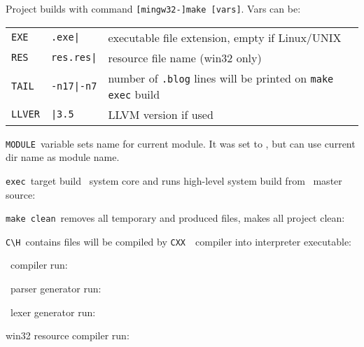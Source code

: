 \label{makes}

Project builds with command \verb|[mingw32-]make [vars]|. Vars can be:\bigskip

\begin{tabular}{l l l}
\verb$EXE$ & \verb$.exe|$ & executable file extension, empty if Linux/UNIX \\ 
\verb$RES$ & \verb$res.res|$ & resource file name (win32 only) \\
\verb$TAIL$ & \verb$-n17|-n7$ & number of \verb$.blog$ lines
will be printed on \verb$make exec$ build \\
\verb$LLVER$ & \verb$|3.5$ & LLVM version if used \\
\end{tabular}\bigskip

\verb|MODULE|\ variable sets name for current module.
It was set to \bi, but can use current dir name as module name. 


\verb|exec|\ target build \bi\ system core and runs high-level system build 
from \ master source: 


\verb|make clean|\ removes all temporary and produced files, makes all project
clean:


\verb|C\H|\ contains files will be compiled by \verb|CXX|\ \cpp\ compiler
into interpreter executable:


\cpp\ compiler run:


\ parser generator run:


\ lexer generator run:


win32 resource compiler run:

